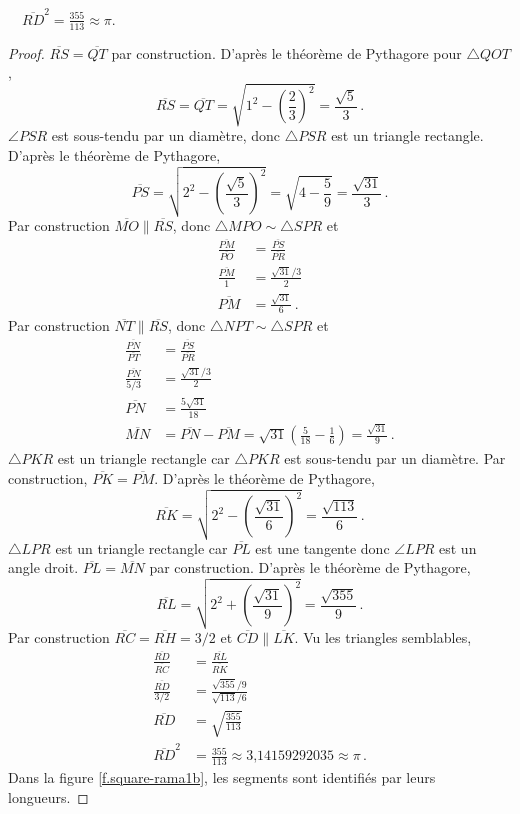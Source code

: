 \begin{theorem}
$\quad\overline{RD}^2=\displaystyle\frac{355}{113}\approx \pi$.
\end{theorem}


\begin{proof}
$\overline{RS}=\overline{QT}$ par construction. D'après le théorème de Pythagore pour $\triangle QOT$,
\[
\overline{RS} =\overline{QT} =\sqrt{1^2-\left(\frac{2}{3}\right)^2}=\frac{\sqrt{5}}{3}\,.
\]
$\angle PSR$ est sous-tendu par un diamètre, donc $\triangle PSR$ est un triangle rectangle. D'après le théorème de Pythagore,
\[
\overline{PS} = \sqrt{2^2-\left(\frac{\sqrt{5}}{3}\right)^2}=\sqrt{4-\frac{5}{9}}=\frac{\sqrt{31}}{3}\,.
\]
Par construction $\overline{MO}\parallel \overline{RS}$, donc 
$\triangle MPO\sim \triangle SPR$ et 
%
\begin{align*}
\frac{\overline{PM}}{\overline{PO}}&=\frac{\overline{PS}}{\overline{PR}}\\
\frac{\overline{PM}}{1}&=\frac{\sqrt{31}/3}{2}\\
\overline{PM}&=\frac{\sqrt{31}}{6}\,.
\end{align*}
Par construction $\overline{NT}\parallel \overline{RS}$, donc  
$\triangle NPT\sim \triangle SPR$  et 
\begin{align*}
\frac{\overline{PN}}{\overline{PT}}&=\frac{\overline{PS}}{\overline{PR}}\\
\frac{\overline{PN}}{5/3}&=\frac{\sqrt{31}/3}{2}\\
\overline{PN}&=\frac{5\sqrt{31}}{18}\\
\overline{MN}&=\overline{PN}-\overline{PM}=\sqrt{31}\left(\frac{5}{18}-\frac{1}{6}\right) = \frac{\sqrt{31}}{9}\,.
\end{align*}
$\triangle PKR$ est un triangle rectangle car $\triangle PKR$ est sous-tendu par un diamètre. Par construction,  $\overline{PK}=\overline{PM}$. D'après le théorème de Pythagore,
\[
\overline{RK}=\sqrt{2^2-\left(\frac{\sqrt{31}}{6}\right)^2} = \frac{\sqrt{113}}{6}\,.
\]
$\triangle LPR$ est un triangle rectangle car  $\overline{PL}$ est une tangente donc $\angle LPR$ est un angle droit. $\overline{PL} = \overline{MN}$ par construction. D'après le théorème de Pythagore,
\[
\overline{RL}=\sqrt{2^2+\left(\frac{\sqrt{31}}{9}\right)^2} = \frac{\sqrt{355}}{9}\,.
\]
Par construction
$\overline{RC}=\overline{RH}=3/2$ et $\overline{CD} \parallel \overline{LK}$. Vu les triangles semblables,
%
\begin{align*}
\frac{\overline{RD}}{\overline{RC}}&=\frac{\overline{RL}}{\overline{RK}}\\
\frac{\overline{RD}}{3/2}&=\frac{\sqrt{355}/9}{\sqrt{113}/6}\\
\overline{RD}&=\sqrt{\frac{355}{113}}\\
\overline{RD}^2&=\frac{355}{113}\approx \mbox{3,14159292035}\approx \pi\,.
\end{align*}
Dans la figure \ref{f.square-rama1b}, les segments sont identifiés par leurs longueurs.
\end{proof}

